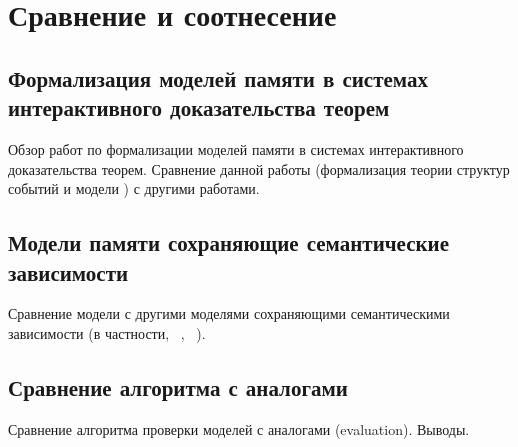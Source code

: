 \chapter{Сравнение и соотнесение}
\label{ch:related-work}

\section{Формализация моделей памяти в системах интерактивного доказательства теорем}

Обзор работ по формализации моделей памяти
в системах интерактивного доказательства теорем.
Сравнение данной работы (формализация теории структур событий
и модели \Wkm) с другими работами.

\section{Модели памяти сохраняющие семантические зависимости}

Сравнение модели \WkmS с другими моделями
сохраняющими семантическими зависимости
(в частности, \Prm~\cite{Kang-al:POPL17}, \PwP~\cite{Jagadeesan-al:OOPSLA2020}).

\section{Сравнение алгоритма \wmc с аналогами}

Сравнение алгоритма проверки моделей с аналогами (evaluation). Выводы. 
